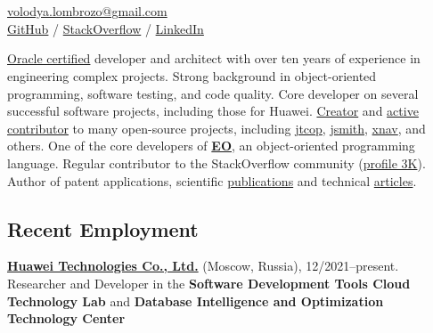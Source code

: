 \documentclass{vl}
\begin{document}
    \vlPrintPhoto{}

    \section*{\Large {}}

    \href{mailto:volodya.lombrozo@gmail.com}{volodya.lombrozo@gmail.com}\\%
    \href{https://github.com/volodya-lombrozo}{GitHub} /
    \href{https://stackoverflow.com/users/10423604/volodya-lombrozo}{StackOverflow} /
    \href{https://www.linkedin.com/in/vladimir-zakharov-lombrozo-b71744216/}{LinkedIn}

    \vspace*{12pt}

    \href{https://catalog-education.oracle.com/pls/certview/sharebadge?id=87F6A2FE819A5A5AF4120A05900AB28A461EE9A3EE9FBFA02721FADAEB3BCE19}{Oracle certified}
    developer and architect with over ten years of experience in engineering complex projects.
    Strong background in object-oriented programming, software testing, and code quality.
    Core developer on several successful software projects, including those for Huawei.
    \href{https://github.com/volodya-lombrozo?tab=repositories}{Creator} and
    \href{https://github.com/volodya-lombrozo}{active contributor} to many open-source projects, including
    \href{https://github.com/volodya-lombrozo/jtcop}{jtcop},
    \href{https://github.com/volodya-lombrozo/jsmith}{jsmith},
    \href{https://github.com/volodya-lombrozo/xnav}{xnav}, and others.
    One of the core developers of \textbf{\href{https://www.eolang.org}{EO}}, an object-oriented programming language.
    Regular contributor to the StackOverflow community
    (\href{https://stackoverflow.com/users/10423604/volodya-lombrozo}{profile 3K}).
    Author of patent applications, scientific \href{https://arxiv.org/abs/2410.05631}{publications} and technical
    \href{https://dzone.com/users/4993224/volodya-lombrozo.html}{articles}.

    \subsection*{Recent Employment}

    \textbf{\href{https://www.huawei.com}{Huawei Technologies Co., Ltd.}} (Moscow, Russia), 12/2021--present.
    Researcher and Developer in the \textbf{Software Development Tools Cloud Technology Lab} and
    \textbf{Database Intelligence and Optimization Technology Center}
\end{document}
